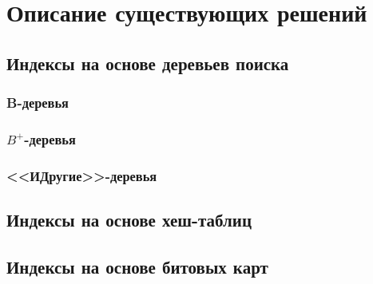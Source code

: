 \chapter{Описание существующих решений}

\section{Индексы на основе деревьев поиска}

\subsection{B-деревья}

\subsection{$B^+$-деревья}

\subsection{<<ИДругие>>-деревья}

\section{Индексы на основе хеш-таблиц}

\section{Индексы на основе битовых карт}

